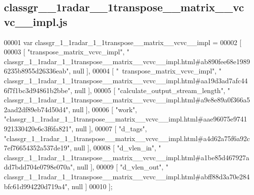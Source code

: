 \subsection{classgr\+\_\+\_\+1radar\+\_\+\_\+1transpose\+\_\+\+\_\+matrix\+\_\+\+\_\+vcvc\+\_\+\+\_\+impl.\+js}
\label{classgr__1__1radar__1__1transpose____matrix____vcvc____impl_8js_source}

\begin{DoxyCode}
00001 var classgr_1_1radar_1_1transpose__matrix__vcvc__impl =
00002 [
00003     [ \textcolor{stringliteral}{"transpose\_matrix\_vcvc\_impl"}, \textcolor{stringliteral}{"
      classgr\_1\_1radar\_1\_1transpose\_\_matrix\_\_vcvc\_\_impl.html#ab890fee68e19896235b8955d26336eab"}, null ],
00004     [ \textcolor{stringliteral}{"~transpose\_matrix\_vcvc\_impl"}, \textcolor{stringliteral}{"
      classgr\_1\_1radar\_1\_1transpose\_\_matrix\_\_vcvc\_\_impl.html#aa19d3ad7afc446f7f1bc3d94861b2bbe"}, null ],
00005     [ \textcolor{stringliteral}{"calculate\_output\_stream\_length"}, \textcolor{stringliteral}{"
      classgr\_1\_1radar\_1\_1transpose\_\_matrix\_\_vcvc\_\_impl.html#a9e8e89a0f366a52aad2df89eb74d50d4"}, null ],
00006     [ \textcolor{stringliteral}{"work"}, \textcolor{stringliteral}{"classgr\_1\_1radar\_1\_1transpose\_\_matrix\_\_vcvc\_\_impl.html#aae96075e9741921330420e6c3f6fa821"}, 
      null ],
00007     [ \textcolor{stringliteral}{"d\_tags"}, \textcolor{stringliteral}{"classgr\_1\_1radar\_1\_1transpose\_\_matrix\_\_vcvc\_\_impl.html#a4d62a75f6a92c7ef76654352a537de19"},
       null ],
00008     [ \textcolor{stringliteral}{"d\_vlen\_in"}, \textcolor{stringliteral}{"
      classgr\_1\_1radar\_1\_1transpose\_\_matrix\_\_vcvc\_\_impl.html#a1be85d467927add7bdd704e0798e070a"}, null ],
00009     [ \textcolor{stringliteral}{"d\_vlen\_out"}, \textcolor{stringliteral}{"
      classgr\_1\_1radar\_1\_1transpose\_\_matrix\_\_vcvc\_\_impl.html#abff88d3a70e284bfc61d994220d719a4"}, null ]
00010 ];
\end{DoxyCode}
